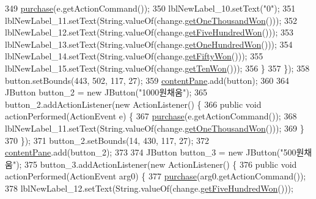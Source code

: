 \begin{DoxyCode}
349                 \hyperlink{class_vending_machine_1_1_machine_u_i_aadccf593dc69281c9ebbfe1fbe09b804}{purchase}(e.getActionCommand());
350                 lblNewLabel\_10.setText(\textcolor{stringliteral}{"0"});
351                 lblNewLabel\_11.setText(String.valueOf(change.\hyperlink{class_vending_machine_1_1_change_a4207ff32f227afb89076b87a3812cf2e}{getOneThousandWon}()));
352                 lblNewLabel\_12.setText(String.valueOf(change.\hyperlink{class_vending_machine_1_1_change_afa26632165b427a19133f182996587a3}{getFiveHundredWon}()));
353                 lblNewLabel\_13.setText(String.valueOf(change.\hyperlink{class_vending_machine_1_1_change_ac814aaff5cfe37b1a71899f750f4d99e}{getOneHundredWon}()));
354                 lblNewLabel\_14.setText(String.valueOf(change.\hyperlink{class_vending_machine_1_1_change_a1ef85014ae005316e4a39db49e8364a7}{getFiftyWon}()));
355                 lblNewLabel\_15.setText(String.valueOf(change.\hyperlink{class_vending_machine_1_1_change_ac6b95aa923e6727f5ecf8095b7f42e99}{getTenWon}()));
356             \}
357         \});
358         button.setBounds(443, 502, 117, 27);
359         \hyperlink{class_vending_machine_1_1_machine_u_i_ac8ef25585e46da798d067af0eefa1a03}{contentPane}.add(button);
360         
364         JButton button\_2 = \textcolor{keyword}{new} JButton(\textcolor{stringliteral}{"1000원채움"});
365         button\_2.addActionListener(\textcolor{keyword}{new} ActionListener() \{
366             \textcolor{keyword}{public} \textcolor{keywordtype}{void} actionPerformed(ActionEvent e) \{
367                 \hyperlink{class_vending_machine_1_1_machine_u_i_aadccf593dc69281c9ebbfe1fbe09b804}{purchase}(e.getActionCommand());
368                 lblNewLabel\_11.setText(String.valueOf(change.\hyperlink{class_vending_machine_1_1_change_a4207ff32f227afb89076b87a3812cf2e}{getOneThousandWon}()));
369             \}
370         \});
371         button\_2.setBounds(14, 430, 117, 27);
372         \hyperlink{class_vending_machine_1_1_machine_u_i_ac8ef25585e46da798d067af0eefa1a03}{contentPane}.add(button\_2);
373         
374         JButton button\_3 = \textcolor{keyword}{new} JButton(\textcolor{stringliteral}{"500원채움"});
375         button\_3.addActionListener(\textcolor{keyword}{new} ActionListener() \{
376             \textcolor{keyword}{public} \textcolor{keywordtype}{void} actionPerformed(ActionEvent arg0) \{
377                 \hyperlink{class_vending_machine_1_1_machine_u_i_aadccf593dc69281c9ebbfe1fbe09b804}{purchase}(arg0.getActionCommand());
378                 lblNewLabel\_12.setText(String.valueOf(change.\hyperlink{class_vending_machine_1_1_change_afa26632165b427a19133f182996587a3}{getFiveHundredWon}()));    

\end{DoxyCode}
